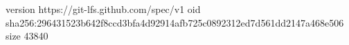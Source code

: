 version https://git-lfs.github.com/spec/v1
oid sha256:296431523b642f8ccd3bfa4d92914afb725c0892312ed7d561dd2147a468e506
size 43840
